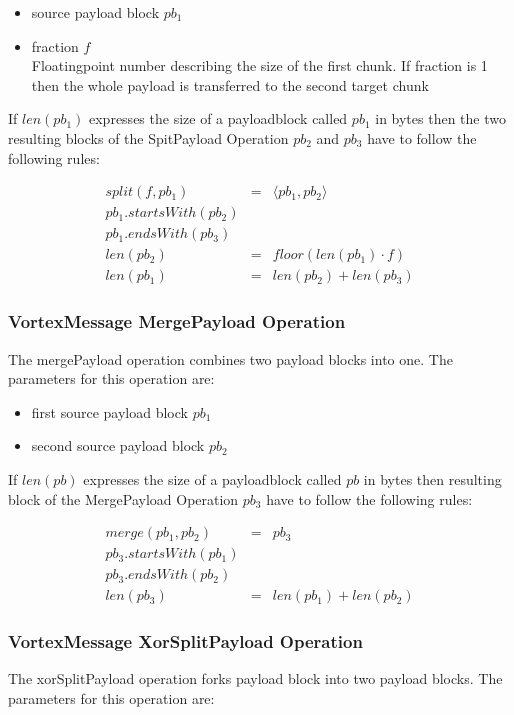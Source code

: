 \begin{itemize}
	\item source payload block $pb_1$
	\item fraction $f$\\
	      Floatingpoint number describing the size of the first chunk. If fraction is 1 then the whole payload is transferred to the second target chunk
\end{itemize}

If $len(pb_1)$ expresses the size of a payloadblock called $pb_1$ in bytes then the two resulting blocks of the SpitPayload Operation $pb_2$ and $pb_3$ have to follow the following rules:

\begin{eqnarray}
split(f, pb_1) & = &\langle pb_1, pb_2 \rangle\\
pb_1.startsWith(pb_2)\\
pb_1.endsWith(pb_3)\\
len(pb_2) & = & floor(len(pb_1)\cdot f)\\
len(pb_1) & = & len(pb_2) + len(pb_3)
\end{eqnarray}


\subsubsection{VortexMessage MergePayload Operation}
The mergePayload operation combines two payload blocks into one. The parameters for this operation are:

\begin{itemize}
	\item first source payload block $pb_1$
	\item second source payload block $pb_2$
\end{itemize}

If $len(pb)$ expresses the size of a payloadblock called $pb$ in bytes then resulting block of the MergePayload Operation $pb_3$ have to follow the following rules:

\begin{eqnarray}
merge(pb_1, pb_2) & = & pb_3 \\
pb_3.startsWith(pb_1)\\
pb_3.endsWith(pb_2)\\
len(pb_3) & = & len(pb_1) + len(pb_2)
\end{eqnarray}

\subsubsection{VortexMessage XorSplitPayload Operation}
The xorSplitPayload operation forks payload block into two payload blocks. The parameters for this operation are:

